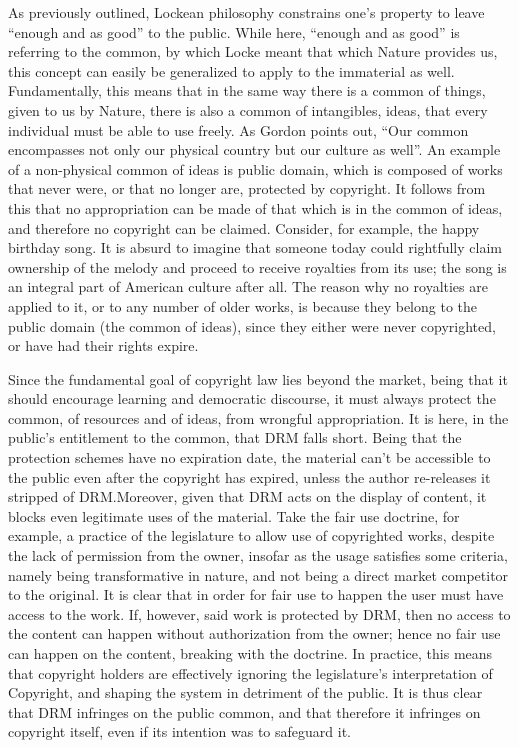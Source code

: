 \documentclass[12pt,letterpaper]{article}
\begin{document}
As previously outlined, Lockean philosophy constrains one's property to leave ``enough and as good''\autocite[\ppno~291]{locke-1988} to the public. While here, ``enough and as good'' is referring to the common, by which Locke meant that which Nature provides us, this concept can easily be generalized to apply to the immaterial as well. Fundamentally, this means that in the same way there is a common of things, given to us by Nature, there is also a common of intangibles, ideas, that every individual must be able to use freely. As Gordon points out, ``Our common encompasses not only our physical country but our culture as well''\autocite[\ppno~1555]{gordon-1993}. An example of a non-physical common of ideas is public domain, which is composed of works that never were, or that no longer are, protected by copyright. It follows from this that no appropriation can be made of that which is in the common of ideas, and therefore no copyright can be claimed. Consider, for example, the happy birthday song. It is absurd to imagine that someone today could rightfully claim ownership of the melody and proceed to receive royalties from its use; the song is an integral part of American culture after all. The reason why no royalties are applied to it, or to any number of older works, is because they belong to the public domain (the common of ideas), since they either were never copyrighted, or have had their rights expire.

Since the fundamental goal of copyright law lies beyond the market, being that it should encourage learning and democratic discourse, it must always protect the common, of resources and of ideas, from wrongful appropriation. It is here, in the public's entitlement to the common, that DRM falls short. Being that the protection schemes have no expiration date, the material can't be accessible to the public even after the copyright has expired, unless the author re-releases it stripped of DRM.\@ Moreover, given that DRM acts on the display of content, it blocks even legitimate uses of the material. Take the fair use doctrine, for example, a practice of the legislature to allow use of copyrighted works, despite the lack of permission from the owner, insofar as the usage satisfies some criteria, namely being transformative in nature, and not being a direct market competitor to the original. It is clear that in order for fair use to happen the user must have access to the work. If, however, said work is protected by DRM, then no access to the content can happen without authorization from the owner; hence no fair use can happen on the content, breaking with the doctrine. In practice, this means that copyright holders are effectively ignoring the legislature's interpretation of Copyright, and shaping the system in detriment of the public. It is thus clear that DRM infringes on the public common, and that therefore it infringes on copyright itself, even if its intention was to safeguard it.
\end{document}
